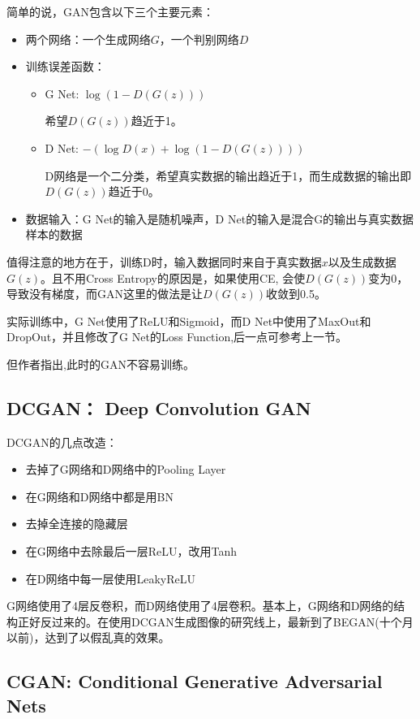 简单的说，GAN包含以下三个主要元素：
\begin{itemize}
\item 两个网络：一个生成网络$G$，一个判别网络$D$
\item 训练误差函数：
\begin{itemize}
\item G Net: $\log (1 - D(G(z)))$

希望$D(G(z))$趋近于1。

\item D Net: $-(\log D(x) + \log(1 - D(G(z))))$

D网络是一个二分类，希望真实数据的输出趋近于1，而生成数据的输出即$D(G(z))$趋近于0。

\end{itemize}
\item 数据输入：G Net的输入是随机噪声，D Net的输入是混合G的输出与真实数据样本的数据
\end{itemize}


值得注意的地方在于，训练D时，输入数据同时来自于真实数据$x$以及生成数据$G(z)$。且不用Cross Entropy的原因是，如果使用CE, 会使$D(G(z))$变为0，导致没有梯度，而GAN这里的做法是让$D(G(z))$收敛到0.5。

实际训练中，G Net使用了ReLU和Sigmoid，而D Net中使用了MaxOut和DropOut，并且修改了G Net的Loss Function,后一点可参考上一节。

但作者指出,此时的GAN不容易训练。

\subsection{DCGAN： Deep Convolution GAN}

DCGAN的几点改造：
\begin{itemize}
\item 去掉了G网络和D网络中的Pooling Layer
\item 在G网络和D网络中都是用BN
\item 去掉全连接的隐藏层
\item 在G网络中去除最后一层ReLU，改用Tanh
\item 在D网络中每一层使用LeakyReLU
\end{itemize}

G网络使用了4层反卷积，而D网络使用了4层卷积。基本上，G网络和D网络的结构正好反过来的。在使用DCGAN生成图像的研究线上，最新到了BEGAN(十个月以前)，达到了以假乱真的效果。

\subsection{CGAN: Conditional Generative Adversarial Nets}

